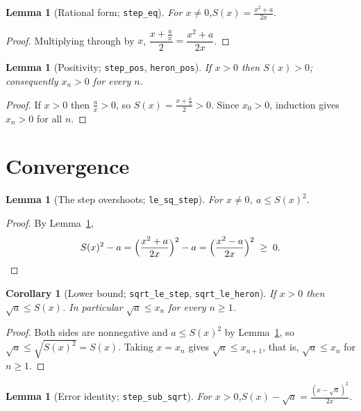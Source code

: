 \documentclass[11pt]{article}
\theoremstyle{plain}
\newtheorem{lemma}[theorem]{Lemma}
\newtheorem{corollary}[theorem]{Corollary}
\theoremstyle{definition}
\theoremstyle{remark}
\begin{document}
\begin{lemma}[Rational form; \texttt{step\_eq}]\label{lem:ratform}
For $x\neq 0$,\qquad $\displaystyle S(x)=\frac{x^2+a}{2x}.$
\end{lemma}

\begin{proof}
Multiplying through by $x$, $\dfrac{x+\frac{a}{x}}{2}=\dfrac{x^2+a}{2x}$.
\end{proof}

\begin{lemma}[Positivity; \texttt{step\_pos}, \texttt{heron\_pos}]\label{lem:pos}
If $x>0$ then $S(x)>0$; consequently $x_n>0$ for every $n$.
\end{lemma}

\begin{proof}
If $x>0$ then $\frac{a}{x}>0$, so $S(x)=\frac{x+\frac{a}{x}}{2}>0$. Since $x_0>0$, induction gives $x_n>0$ for
all $n$.
\end{proof}

\section{Convergence}

\begin{lemma}[The step overshoots; \texttt{le\_sq\_step}]\label{lem:overshoot}
For $x\neq 0$, $a\leq S(x)^2.$
\end{lemma}

\begin{proof}
By Lemma~\ref{lem:ratform},
\[
  S(x)^2-a=\Big(\frac{x^2+a}{2x}\Big)^2-a=\Big(\frac{x^2-a}{2x}\Big)^2\;\geq\;0. \qedhere
\]
\end{proof}

\begin{corollary}[Lower bound; \texttt{sqrt\_le\_step}, \texttt{sqrt\_le\_heron}]\label{cor:lower}
If $x>0$ then $\sqrt{a}\leq S(x)$. In particular $\sqrt{a}\leq x_n$ for every $n\geq 1$.
\end{corollary}

\begin{proof}
Both sides are nonnegative and $a\leq S(x)^2$ by Lemma~\ref{lem:overshoot}, so
$\sqrt{a}\leq\sqrt{S(x)^2}=S(x)$. Taking $x=x_n$ gives $\sqrt{a}\leq x_{n+1}$, that is,
$\sqrt{a}\leq x_n$ for $n\geq 1$.
\end{proof}

\begin{lemma}[Error identity; \texttt{step\_sub\_sqrt}]\label{lem:err}
For $x>0$,\qquad $\displaystyle S(x)-\sqrt{a}=\frac{(x-\sqrt{a})^2}{2x}.$
\end{lemma}
\end{document}
